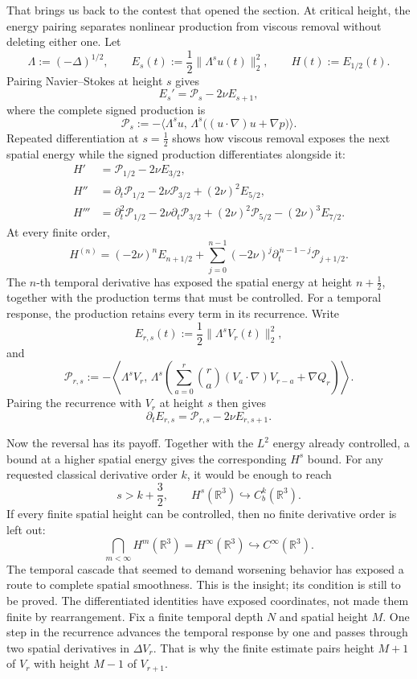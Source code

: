 That brings us back to the contest that opened the section.  At critical
height, the energy pairing separates nonlinear production from viscous removal
without deleting either one.  Let
\[
\Lambda:=(-\Delta)^{1/2},
\qquad
E_s(t):=\frac12\|\Lambda^su(t)\|_2^2,
\qquad
H(t):=E_{1/2}(t).
\]
Pairing Navier--Stokes at height \(s\) gives
\[
E_s'=\mathcal P_s-2\nu E_{s+1},
\]
where the complete signed production is
\[
\mathcal P_s
:=-\bigl\langle
\Lambda^su,\,
\Lambda^s\bigl((u\!\cdot\nabla)u+\nabla p\bigr)
\bigr\rangle.
\]
Repeated differentiation at \(s=\tfrac12\) shows how viscous removal exposes
the next spatial energy while the signed production differentiates alongside
it:
\[
\begin{aligned}
H'
&=\mathcal P_{1/2}-2\nu E_{3/2},\\
H''
&=\partial_t\mathcal P_{1/2}
  -2\nu\mathcal P_{3/2}
  +(2\nu)^2E_{5/2},\\
H'''
&=\partial_t^2\mathcal P_{1/2}
  -2\nu\partial_t\mathcal P_{3/2}
  +(2\nu)^2\mathcal P_{5/2}
  -(2\nu)^3E_{7/2}.
\end{aligned}
\]
At every finite order,
\[
H^{(n)}
=(-2\nu)^nE_{n+1/2}
+\sum_{j=0}^{n-1}(-2\nu)^j
 \partial_t^{\,n-1-j}\mathcal P_{j+1/2}.
\]
The \(n\)-th temporal derivative has exposed the spatial energy at height
\(n+\tfrac12\), together with the production terms that must be controlled.
For a temporal response, the production retains every term in its recurrence.
Write
\[
E_{r,s}(t):=\frac12\|\Lambda^sV_r(t)\|_2^2,
\]
and
\[
\mathcal P_{r,s}
:=-\left\langle
\Lambda^sV_r,\,
\Lambda^s\left(
\sum_{a=0}^{r}\binom ra(V_a\!\cdot\nabla)V_{r-a}
+\nabla Q_r
\right)
\right\rangle.
\]
Pairing the recurrence with \(V_r\) at height \(s\) then gives
\[
\partial_tE_{r,s}
=\mathcal P_{r,s}-2\nu E_{r,s+1}.
\]

Now the reversal has its payoff.  Together with the \(L^2\) energy already
controlled, a bound at a higher spatial energy gives the corresponding
\(H^s\) bound.  For any requested classical derivative order \(k\), it would
be enough to reach
\[
s>k+\frac32,
\qquad
H^s(\mathbb R^3)\hookrightarrow C_b^k(\mathbb R^3).
\]
If every finite spatial height can be controlled, then no finite derivative
order is left out:
\[
\bigcap_{m<\infty}H^m(\mathbb R^3)
=H^\infty(\mathbb R^3)
\hookrightarrow C^\infty(\mathbb R^3).
\]
The temporal cascade that seemed to demand worsening behavior has exposed a
route to complete spatial smoothness.  This is the insight; its condition is
still to be proved.  The differentiated identities have exposed coordinates,
not made them finite by rearrangement.  Fix a finite
temporal depth \(N\) and spatial height \(M\).  One step in the recurrence
advances the temporal response by one and passes through two spatial derivatives
in \(\Delta V_r\).  That is why the finite estimate pairs height \(M+1\)
of \(V_r\) with height \(M-1\) of \(V_{r+1}\).


